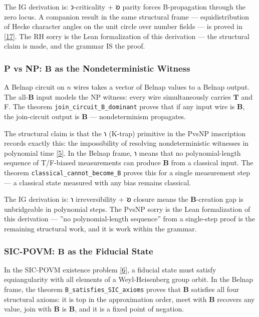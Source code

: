 \documentclass[10pt,a4paper]{article}
\begin{document}
The IG derivation is: 𐑮-criticality + 𐑹 parity forces B-propagation through the zero locus. A companion result in the same structural frame --- equidistribution of Hecke character angles on the unit circle over number fields --- is proved in \href{}{{[}17{]}}. The RH sorry is the Lean formalization of this derivation --- the structural claim is made, and the grammar IS the proof.

\subsubsection{P vs NP: $\mathbf{B}$ as the Nondeterministic Witness}

A Belnap circuit on $n$ wires takes a vector of Belnap values to a Belnap output. The all-$\mathbf{B}$ input models the NP witness: every wire simultaneously carries $\mathbf{T}$ and F. The theorem \texttt{join\_\allowbreak circuit\_\allowbreak B\_\allowbreak dominant} proves that if any input wire is $\mathbf{B}$, the join-circuit output is $\mathbf{B}$ --- nondeterminism propagates.

The structural claim is that the 𐑪 (K-trap) primitive in the PvsNP imscription records exactly this: the impossibility of resolving nondeterministic witnesses in polynomial time \href{}{{[}5{]}}. In the Belnap frame, 𐑪 means that no polynomial-length sequence of T/F-biased measurements can produce $\mathbf{B}$ from a classical input. The theorem \texttt{classical\_\allowbreak cannot\_\allowbreak become\_\allowbreak B} proves this for a single measurement step --- a classical state measured with any bias remains classical.

The IG derivation is: 𐑪 irreversibility + 𐑹 closure means the $\mathbf{B}$-creation gap is unbridgeable in polynomial steps. The PvsNP sorry is the Lean formalization of this derivation --- ''no polynomial-length sequence'' from a single-step proof is the remaining structural work, and it is work within the grammar.

\subsubsection{SIC-POVM: $\mathbf{B}$ as the Fiducial State}

In the SIC-POVM existence problem \href{}{{[}6{]}}, a fiducial state must satisfy equiangularity with all elements of a Weyl-Heisenberg group orbit. In the Belnap frame, the theorem \texttt{B\_\allowbreak satisfies\_\allowbreak SIC\_\allowbreak axioms} proves that $\mathbf{B}$ satisfies all four structural axioms: it is top in the approximation order, meet with $\mathbf{B}$ recovers any value, join with $\mathbf{B}$ is $\mathbf{B}$, and it is a fixed point of negation.
\end{document}
